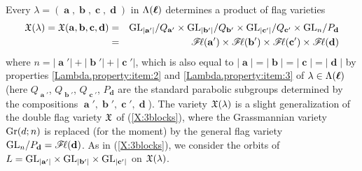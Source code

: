 \documentclass[12pt,reqno]{amsart}
\begin{document}
Every $\lambda=(\mbfa,\mbfb,\mbfc,\mbfd)$ in $\Lambda(\boldsymbol{\ell})$ determines a product of flag varieties
%
\begin{eqnarray}\label{eq:def.of.Xabcd}
\mathfrak{X}(\lambda) = \mathfrak{X}(\mathbf{a},\mathbf{b},\mathbf{c},\mathbf{d})
 & = & \mathrm{GL}_{|\mathbf{a}'|}/Q_{\mathbf{a}'} \times \mathrm{GL}_{|\mathbf{b}'|}/Q_{\mathbf{b}'} \times \mathrm{GL}_{|\mathbf{c}'|}/Q_{\mathbf{c}'} \times \mathrm{GL}_n/P_{\mathbf{d}} \nonumber \\
 & = & \mathscr{F}\!\ell(\mathbf{a}')\times \mathscr{F}\!\ell(\mathbf{b}')\times
 \mathscr{F}\!\ell(\mathbf{c}')\times \mathscr{F}\!\ell(\mathbf{d})
\end{eqnarray}
%
where $n=|\mbfa'| + |\mbfb'| + |\mbfc'|$, which is also equal to
$ |\mbfa|=|\mbfb|=|\mbfc|=|\mbfd| $ by properties
\ref{Lambda.property:item:2} and
\ref{Lambda.property:item:3}
of $ \lambda \in \Lambda(\boldsymbol{\ell}) $
(here $Q_{\mbfa'}$, $Q_{\mbfb'}$, $Q_{\mbfc'}$, $P_{\mbfd}$ are the standard parabolic subgroups
determined by the compositions $\mbfa',\mbfb',\mbfc',\mbfd$).
%
The variety $\mathfrak{X}(\lambda)$
is a slight generalization of the double flag variety $\mathfrak{X}$ of (\ref{X:3blocks}), where the Grassmannian variety $\mathrm{Gr}(d;n)$ is replaced (for the moment) by the general flag variety $\mathrm{GL}_n/P_{\mathbf{d}}=\mathscr{F}\!\ell(\mathbf{d})$.
As in (\ref{X:3blocks}),
we consider
the orbits of
$ L = \mathrm{GL}_{|\mathbf{a}'|} \times \mathrm{GL}_{|\mathbf{b}'|} \times \mathrm{GL}_{|\mathbf{c}'|} $ on $\mathfrak{X}(\lambda)$.
\end{document}
